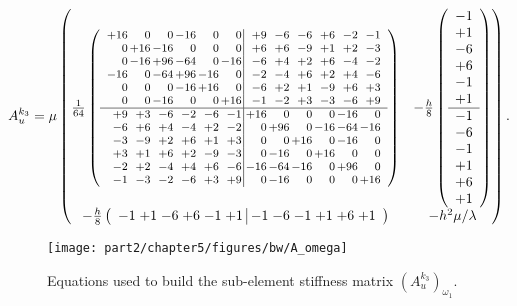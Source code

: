 \begin{equation} \label{eq:ch5.stiffnessmatrix.interior}
A_u^{k_3} =
\mu
\begin{pmatrix}
\frac{1}{64}
\lrp{\footnotesize \begin{array}{*{6}{r@{\,}}|*{6}{@{\,}r}}
+16&  0&  0&-16&  0&  0& +9& -6& -6& +6& -2& -1\\
  0&+16&-16&  0&  0&  0& +6& +6& -9& +1& +2& -3\\
  0&-16&+96&-64&  0&-16& -6& +4& +2& +6& -4& -2\\
-16&  0&-64&+96&-16&  0& -2& -4& +6& +2& +4& -6\\
  0&  0&  0&-16&+16&  0& -6& +2& +1& -9& +6& +3\\
  0&  0&-16&  0&  0&+16& -1& -2& +3& -3& -6& +9\\\hline
 +9& +3& -6& -2& -6& -1&+16&  0&  0&  0&-16&  0\\
 -6& +6& +4& -4& +2& -2&  0&+96&  0&-16&-64&-16\\
 -3& -9& +2& +6& +1& +3&  0&  0&+16&  0&-16&  0\\
 +3& +1& +6& +2& -9& -3&  0&-16&  0&+16&  0&  0\\
 -2& +2& -4& +4& +6& -6&-16&-64&-16&  0&+96&  0\\
 -1& -3& -2& -6& +3& +9&  0&-16&  0&  0&  0&+16
\end{array}} &
-\frac{h}{8}
\lrp{\begin{array}{c}
-1\\+1\\-6\\+6\\-1\\+1\\\hline-1\\-6\\-1\\+1\\+6\\+1
\end{array}} \\
-\frac{h}{8}
\lrp{\begin{array}{*{6}{r@{\;}}|*{6}{@{\;}r}}
-1&+1&-6&+6&-1&+1&-1&-6&-1&+1&+6&+1
\end{array}} &
-h^2 \mu / \lambda
\end{pmatrix}.
\end{equation}

\setlength{\figurewidth}{0.60\columnwidth}
\begin{figure}[htbp]
\begin{center}
\texttt{[image: part2/chapter5/figures/bw/A\_omega]}
\caption{Equations used to build the sub-element stiffness matrix $(A_u^{k_3})_{\omega_1}$.}
\label{fig:ch5:stiffnessmatrix.omega1}
\end{center}
\end{figure}

